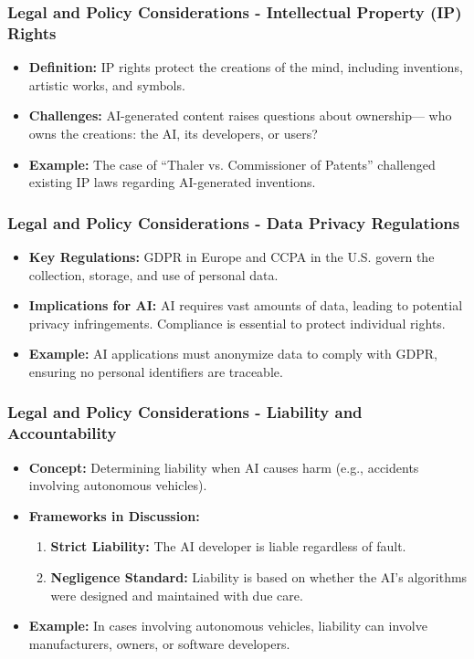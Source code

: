 \documentclass[aspectratio=169]{beamer}
\begin{document}
\begin{frame}[fragile]
    \frametitle{Legal and Policy Considerations - Intellectual Property (IP) Rights}
    \begin{itemize}
        \item \textbf{Definition:} IP rights protect the creations of the mind, including inventions, artistic works, and symbols.
        \item \textbf{Challenges:} AI-generated content raises questions about ownership— who owns the creations: the AI, its developers, or users?
        \item \textbf{Example:} The case of “Thaler vs. Commissioner of Patents” challenged existing IP laws regarding AI-generated inventions.
    \end{itemize}
\end{frame}

\begin{frame}[fragile]
    \frametitle{Legal and Policy Considerations - Data Privacy Regulations}
    \begin{itemize}
        \item \textbf{Key Regulations:} GDPR in Europe and CCPA in the U.S. govern the collection, storage, and use of personal data.
        \item \textbf{Implications for AI:} AI requires vast amounts of data, leading to potential privacy infringements. Compliance is essential to protect individual rights.
        \item \textbf{Example:} AI applications must anonymize data to comply with GDPR, ensuring no personal identifiers are traceable.
    \end{itemize}
\end{frame}

\begin{frame}[fragile]
    \frametitle{Legal and Policy Considerations - Liability and Accountability}
    \begin{itemize}
        \item \textbf{Concept:} Determining liability when AI causes harm (e.g., accidents involving autonomous vehicles).
        \item \textbf{Frameworks in Discussion:}
        \begin{enumerate}
            \item \textbf{Strict Liability:} The AI developer is liable regardless of fault.
            \item \textbf{Negligence Standard:} Liability is based on whether the AI's algorithms were designed and maintained with due care.
        \end{enumerate}
        \item \textbf{Example:} In cases involving autonomous vehicles, liability can involve manufacturers, owners, or software developers.
    \end{itemize}
\end{frame}
\end{document}
